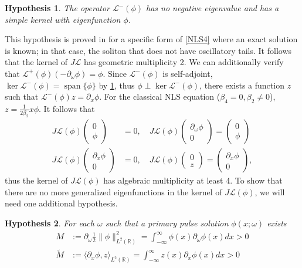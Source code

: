 \documentclass[12pt]{elsarticle}
\def\R{{\mathbb R}}
\def\calL{{\mathcal L}}
\DeclareMathOperator{\spn}{span}
\newtheorem{hypothesis}{Hypothesis}
\begin{document}
\begin{hypothesis}\label{hyp:Lminusspec}
The operator $\calL^-(\phi)$ has no negative eigenvalue and has a simple kernel with eigenfunction $\phi$.
\end{hypothesis}

This hypothesis is proved in \cite{Natali2015} for a specific form of \cref{NLS4} where an exact solution is known; in that case, the soliton that does not have oscillatory tails. It follows that the kernel of $J \calL$ has geometric multiplicity 2. We can additionally verify that $\calL^+(\phi)(-\partial_\omega \phi) = \phi$. Since $\calL^-(\phi)$ is self-adjoint, $\ker \calL^-(\phi) = \spn\{\phi\}$ by \cref{hyp:Lminusspec}, thus $\phi \perp \ker \calL^-(\phi)$, there exists a function $z$ such that $\calL^-(\phi) z = \partial_x \phi$. For the classical NLS equation ($\beta_4 = 0, \beta_2 \neq 0$), $z = \frac{1}{2 \beta_2} x \phi$. It follows that
\begin{equation}\label{Lphikernel}
\begin{aligned}
J \calL(\phi)\begin{pmatrix}0 \\ \phi \end{pmatrix} &= 0, \quad
J \calL(\phi)\begin{pmatrix} \partial_\omega \phi \\ 0 \end{pmatrix} = \begin{pmatrix}0 \\ \phi \end{pmatrix} \\
J \calL(\phi)\begin{pmatrix}\partial_x\phi \\ 0 \end{pmatrix} &= 0, \quad
J \calL(\phi)\begin{pmatrix} 0 \\ z \end{pmatrix} = \begin{pmatrix}\partial_x\phi \\ 0 \end{pmatrix},
\end{aligned}
\end{equation}
thus the kernel of $J \calL(\phi)$ has algebraic multiplicity at least 4. To show that there are no more generalized eigenfunctions in the kernel of $J \calL(\phi)$, we will need one additional hypothesis. 

\begin{hypothesis}\label{hyp:Mcond}
For each $\omega$ such that a primary pulse solution $\phi(x; \omega)$ exists
\begin{align}
M &:= \partial_\omega \frac{1}{2} \| \phi \|_{L^2(\R)}^2
= \int_{-\infty}^\infty \phi(x) \partial_\omega \phi(x) dx > 0 \label{eq:M} \\
\tilde{M} &:= \langle \partial_x \phi, z \rangle_{L^2(\R)} = \int_{-\infty}^\infty z(x) \partial_x \phi(x) dx > 0 \label{eq:tildeM}
\end{align}
\end{hypothesis}
\end{document}
